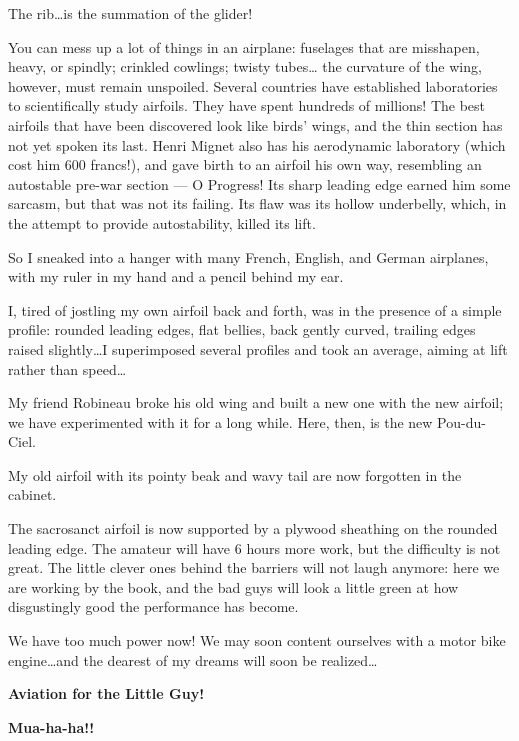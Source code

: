 \documentclass{book}
\begin{document}
The rib\ldots is the summation of the glider!

You can mess up a lot of things in an airplane: fuselages that are
misshapen, heavy, or spindly; crinkled cowlings; twisty tubes\ldots
the curvature of the wing, however, must remain unspoiled.  Several
countries have established laboratories to scientifically study
airfoils.  They have spent hundreds of millions!  The best airfoils
that have been discovered look like birds' wings, and the thin section
has not yet spoken its last.  Henri Mignet also has his aerodynamic
laboratory (which cost him 600 francs!), and gave birth to an airfoil
his own way, resembling an autostable pre-war section --- O Progress!
Its sharp leading edge earned him some sarcasm, but that was not its
failing.  Its flaw was its hollow underbelly, which, in the attempt to
provide autostability, killed its lift.

So I sneaked into a hanger with many French, English, and German
airplanes, with my ruler in my hand and a pencil behind my ear.

I, tired of jostling my own airfoil back and forth, was in the
presence of a simple profile: rounded leading edges, flat bellies,
back gently curved, trailing edges raised slightly\ldots I
superimposed several profiles and took an average, aiming at lift
rather than speed\ldots

My friend Robineau broke his old wing and built a new one with the new
airfoil; we have experimented with it for a long while.  Here, then,
is the new Pou-du-Ciel.

My old airfoil with its pointy beak and wavy tail are now forgotten in
the cabinet.

The sacrosanct airfoil is now supported by a plywood sheathing on the
rounded leading edge.  The amateur will have 6 hours more work, but
the difficulty is not great.  The little clever ones behind the
barriers will not laugh anymore: here we are working by the book, and
the bad guys will look a little green at how disgustingly good the
performance has become.

We have too much power now!  We may soon content ourselves with a
motor bike engine\ldots and the dearest of my dreams will soon be
realized\ldots

\begin{center}
  {\large \textbf{Aviation for the Little Guy!}
    
    \textbf{Mua-ha-ha!!}
  }
\end{center}
\end{document}
